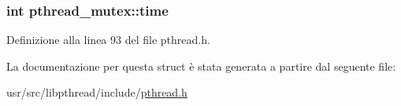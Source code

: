 \hypertarget{structpthread__mutex_abd1e1875e0231a5dd6146adb8d6380c0}{
\subsubsection[{time}]{\setlength{\rightskip}{0pt plus 5cm}int pthread\+\_\+mutex\+::time}}\label{structpthread__mutex_abd1e1875e0231a5dd6146adb8d6380c0}


Definizione alla linea 93 del file pthread.\+h.



La documentazione per questa struct è stata generata a partire dal seguente file\+:\begin{DoxyCompactItemize}
\item 
usr/src/libpthread/include/\hyperlink{pthread_8h}{pthread.\+h}\end{DoxyCompactItemize}
